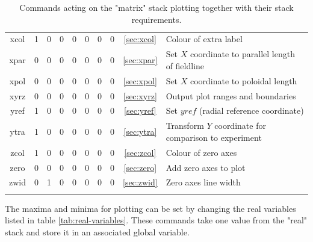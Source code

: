 \documentclass[a4paper,10pt]{report}
\begin{document}
\begin{center}
\begin{longtable}{|c|c|c|c|c|c|c|c|c|l|}
    xcol \index{b2plot, xcol}      & 1 & 0 & 0 & 0 & 0 & 0 & 0 & \ref{sec:xcol}   & Colour of extra label \\
    xpar \index{b2plot, xpar}      & 0 & 0 & 0 & 0 & 0 & 0 & 0 & \ref{sec:xpar}   & Set $X$ coordinate to parallel length of fieldline \\
    xpol \index{b2plot, xpol}      & 0 & 0 & 0 & 0 & 0 & 0 & 0 & \ref{sec:xpol}   & Set $X$ coordinate to poloidal length \\
    xyrz \index{b2plot, xyrz}      & 0 & 0 & 0 & 0 & 0 & 0 & 0 & \ref{sec:xyrz}   & Output plot ranges and boundaries \\
    yref \index{b2plot, yref}      & 1 & 0 & 0 & 0 & 0 & 0 & 0 & \ref{sec:yref}   & Set $yref$ (radial reference coordinate) \\
    ytra \index{b2plot, ytra}      & 1 & 0 & 0 & 0 & 0 & 0 & 0 & \ref{sec:ytra}   & Transform $Y$ coordinate for comparison to experiment \\
    zcol \index{b2plot, zcol}      & 1 & 0 & 0 & 0 & 0 & 0 & 0 & \ref{sec:zcol}   & Colour of zero axes \\
    zero \index{b2plot, zero}      & 0 & 0 & 0 & 0 & 0 & 0 & 0 & \ref{sec:zero}   & Add zero axes to plot \\
    zwid \index{b2plot, zwid}      & 0 & 1 & 0 & 0 & 0 & 0 & 0 & \ref{sec:zwid}   & Zero axes line width \\
    \hline
    \caption{Commands acting on the "matrix" stack plotting together with their stack requirements.}
    \label{tab:matrixplot-commands}
  \end{longtable}
\end{center}

The maxima and minima for plotting can
be set by changing the real variables listed in table
\ref{tab:real-variables}.  These commands take one value from the
"real" stack and store it in an associated global variable.
\end{document}
